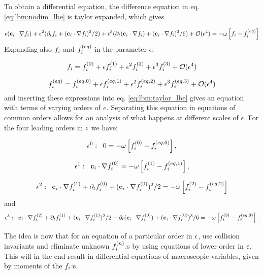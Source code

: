 To obtain a differential equation, the difference equation in
eq. \eqref{eq:lbm:nodim_lbe} is taylor expanded, which gives

\begin{equation}\label{eq:lbm:taylor_lbe}
\epsilon(\mathbf{c}_i\cdot\nabla f_i) + \epsilon^2 (\partial_tf_i + (\mathbf{c}_i\cdot\nabla f_i)^2/2 ) + \epsilon^3
(\partial_t (\mathbf{c}_i\cdot\nabla f_i) + (\mathbf{c}_i\cdot\nabla f_i)^3/6) + \mathcal{O}(\epsilon^4) = 
-\omega \left[
  f_i - f_i^{(eq)} \right]
\end{equation}
Expanding also $f_i$ and $f_i^{(eq)}$ in the parameter $\epsilon$:

\begin{equation}\label{eq:lbm:fi_exp}
f_i = f_i^{(0)} + \epsilon f_i^{(1)} + \epsilon^2f_i^{(2)} + \epsilon^3f_i^{(3)} + \mathcal{O}(\epsilon^4)
\end{equation}

\begin{equation}\label{eq:lbm:fi_eq_exp}
f_i^{(eq)} = f_i^{(eq, 0)} + \epsilon f_i^{(eq, 1)} + \epsilon^2f_i^{(eq, 2)} + \epsilon^3f_i^{(eq, 3)} +
\mathcal{O}(\epsilon^4)
\end{equation}
and inserting these expressions into eq. \eqref{eq:lbm:taylor_lbe}
gives an equation with terms of varying orders of $\epsilon$. Separating
this equation in equations of common orders allows for an analysis of
what happens at different scales of $\epsilon$. For the four leading
orders in $\epsilon$ we have:

\begin{equation}\label{eq:lbm:ep0}
\epsilon^0:\;\; 0 = -\omega \left[
  f_i^{(0)} - f_i^{(eq, 0)} \right],
\end{equation}

\begin{equation}\label{eq:lbm:ep1}
\epsilon^1:\;\; \mathbf{c}_i\cdot\nabla f_i^{(0)} = -\omega \left[
  f_i^{(1)} - f_i^{(eq, 1)} \right],
\end{equation}

\begin{equation}\label{eq:lbm:ep2}
\epsilon^2:\;\; \mathbf{c}_i\cdot\nabla f_i^{(1)} + \partial_tf_i^{(0)} + (\mathbf{c}_i\cdot\nabla f_i^{(0)})^2/2 =
-\omega \left[ f_i^{(2)} - f_i^{(eq, 2)} \right]
\end{equation}
and
\begin{equation}\label{eq:lbm:ep3}
\epsilon^3:\;\; \mathbf{c}_i\cdot\nabla f_i^{(2)} + \partial_tf_i^{(1)} + (\mathbf{c}_i\cdot\nabla f_i^{(1)})^2/2 +
\partial_t (\mathbf{c}_i\cdot\nabla f_i^{(0)}) + (\mathbf{c}_i\cdot\nabla f_i^{(0)})^3/6 = -\omega \left[ f_i^{(3)} -
  f_i^{(eq, 3)} \right].
\end{equation}

The idea is now that for an equation of a particular order in $\epsilon$,
use collision invariants and eliminate unknown $f_i^{(n)}$:s by using
equations of lower order in $\epsilon$. This will in the end result in
differential equations of macroscopic variables, given by moments of
the $f_i$:s.
